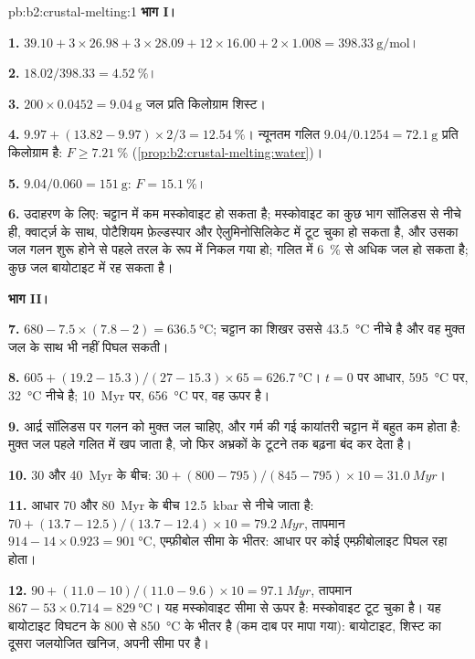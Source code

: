 \begin{solution}{pb:b2:crustal-melting:1}
\noindent\textbf{भाग I।}

\textbf{1.} $39.10 + 3\times26.98 + 3\times28.09 + 12\times16.00 + 2\times1.008 =
\qty{398.33}{\gram\per\mole}$।

\textbf{2.} $18.02/398.33 = \qty{4.52}{\percent}$।

\textbf{3.} $200\times0.0452 = \qty{9.04}{\gram}$ जल प्रति किलोग्राम शिस्ट।

\textbf{4.} $9.97 + (13.82 - 9.97)\times2/3 = \qty{12.54}{\percent}$। न्यूनतम गलित
$9.04/0.1254 = \qty{72.1}{\gram}$ प्रति किलोग्राम है: $F \ge \qty{7.21}{\percent}$
(\cref{prop:b2:crustal-melting:water})।

\textbf{5.} $9.04/0.060 = \qty{151}{\gram}$: $F = \qty{15.1}{\percent}$।

\textbf{6.} उदाहरण के लिए: चट्टान में कम मस्कोवाइट हो सकता है; मस्कोवाइट का कुछ भाग सॉलिडस से नीचे ही,
क्वार्ट्ज़ के साथ, पोटैशियम फ़ेल्डस्पार और ऐलुमिनोसिलिकेट
में टूट चुका हो सकता है, और उसका जल गलन शुरू होने से पहले
तरल के रूप में निकल गया हो; गलित में \qty{6}{\percent} से अधिक जल हो सकता है; कुछ जल बायोटाइट में रह सकता है।

\noindent\textbf{भाग II।}

\textbf{7.} $680 - 7.5\times(7.8 - 2) = \qty{636.5}{\celsius}$; चट्टान का शिखर
उससे \qty{43.5}{\celsius} नीचे है और वह मुक्त जल के साथ भी नहीं पिघल सकती।

\textbf{8.} $605 + (19.2 - 15.3)/(27 - 15.3)\times65 = \qty{626.7}{\celsius}$।
$t = 0$ पर आधार, \qty{595}{\celsius} पर, \qty{32}{\celsius} नीचे है;
\qty{10}{Myr} पर, \qty{656}{\celsius} पर, वह ऊपर है।

\textbf{9.} आर्द्र सॉलिडस पर गलन को मुक्त जल चाहिए, और गर्म की गई कायांतरी चट्टान में
बहुत कम होता है: मुक्त जल पहले गलित में खप जाता है, जो फिर अभ्रकों के टूटने तक
बढ़ना बंद कर देता है।

\textbf{10.} 30 और \qty{40}{Myr} के बीच: $30 + (800 - 795)/(845 - 795)\times10 =
\qty{31.0}{Myr}$।

\textbf{11.} आधार 70 और \qty{80}{Myr} के बीच \qty{12.5}{kbar} से नीचे जाता है:
$70 + (13.7 - 12.5)/(13.7 - 12.4)\times10 = \qty{79.2}{Myr}$, तापमान
$914 - 14\times0.923 = \qty{901}{\celsius}$, एम्फ़ीबोल सीमा के भीतर: आधार पर कोई एम्फ़ीबोलाइट
पिघल रहा होता।

\textbf{12.} $90 + (11.0 - 10)/(11.0 - 9.6)\times10 = \qty{97.1}{Myr}$, तापमान $867 -
53\times0.714 = \qty{829}{\celsius}$। यह मस्कोवाइट सीमा से ऊपर है: मस्कोवाइट
टूट चुका है। यह बायोटाइट विघटन के 800 से \qty{850}{\celsius} के भीतर है
(कम दाब पर मापा गया): बायोटाइट, शिस्ट का दूसरा जलयोजित खनिज, अपनी
सीमा पर है।


\end{solution}
